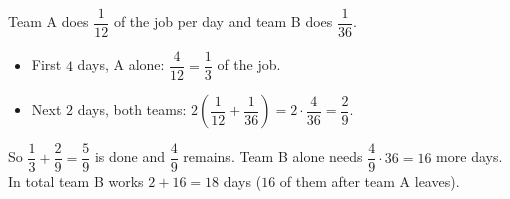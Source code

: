 Team A does $\dfrac{1}{12}$ of the job per day and team B does $\dfrac{1}{36}$.
\begin{itemize}
\item First $4$ days, A alone: $\dfrac{4}{12}=\dfrac{1}{3}$ of the job.
\item Next $2$ days, both teams: $2\left(\dfrac{1}{12}+\dfrac{1}{36}\right)=2\cdot\dfrac{4}{36}=\dfrac{2}{9}$.
\end{itemize}
So $\dfrac{1}{3}+\dfrac{2}{9}=\dfrac{5}{9}$ is done and $\dfrac{4}{9}$ remains. Team B alone needs $\dfrac{4}{9}\cdot36=16$ more days. In total team B works $2+16=\boxed{18}$ days ($16$ of them after team A leaves).

